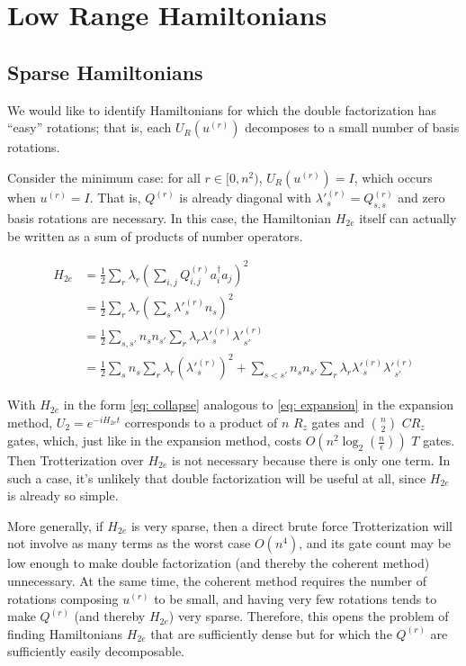 

\chapter{Low Range Hamiltonians}

\section{Sparse Hamiltonians}

We would like to identify Hamiltonians for which the double factorization has ``easy'' rotations; that is, each $U_R(u^{(r)})$ decomposes to a small number of basis rotations.

Consider the minimum case: for all $r \in [0, n^2)$, $U_R(u^{(r)}) = I$, which occurs when $u^{(r)} = I$. That is, $Q^{(r)}$ is already diagonal with $\lambda'^{(r)}_s = Q^{(r)}_{s, s}$ and zero basis rotations are necessary. In this case, the Hamiltonian $H_{2e}$ itself can actually be written as a sum of products of number operators. 

\begin{equation}
    \begin{split}
        H_{2e} &= \frac{1}{2}\sum_r\lambda_r\left(\sum_{i,j} Q^{(r)}_{i, j}a^\dag_ia_j\right)^2 \\
        &= \frac{1}{2}\sum_r\lambda_r(\sum_{s} \lambda'^{(r)}_sn_s)^2 \\
        &= \frac{1}{2}\sum_{s, s'} n_sn_{s'}\sum_r\lambda_r\lambda'^{(r)}_s\lambda'^{(r)}_{s'} \\
        &= \frac{1}{2}\sum_s n_s\sum_r\lambda_r(\lambda'^{(r)}_s)^2 + \sum_{s < s'} n_sn_{s'}\sum_r\lambda_r\lambda'^{(r)}_s\lambda'^{(r)}_{s'} \label{eq: collapse}
    \end{split}
\end{equation}

With $H_{2e}$ in the form \eqref{eq: collapse} analogous to \eqref{eq: expansion} in the expansion method, $U_2 = e^{-iH_{2e}t}$ corresponds to a product of $n$ $R_z$ gates and ${n \choose 2}$ $CR_z$ gates, which, just like in the expansion method, costs $O(n^2\log_2(\frac{n}{\epsilon}))$ $T$ gates. Then Trotterization over $H_{2e}$ is not necessary because there is only one term. In such a case, it's unlikely that double factorization will be useful at all, since $H_{2e}$ is already so simple.

More generally, if $H_{2e}$ is very sparse, then a direct brute force Trotterization will not involve as many terms as the worst case $O(n^4)$, and its gate count may be low enough to make double factorization (and thereby the coherent method) unnecessary. At the same time, the coherent method requires the number of rotations composing $u^{(r)}$ to be small, and having very few rotations tends to make $Q^{(r)}$ (and thereby $H_{2e}$) very sparse. Therefore, this opens the problem of finding Hamiltonians $H_{2e}$ that are sufficiently dense but for which the $Q^{(r)}$ are sufficiently easily decomposable.

